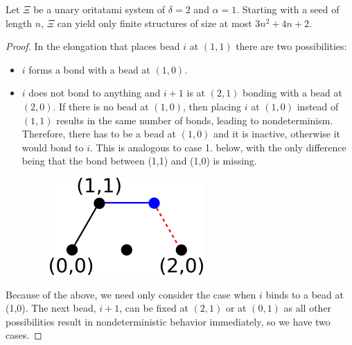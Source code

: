 \begin{lemma}[$\delta=2, \alpha =1$]\label{lem:d2a1}
	Let $\Xi$ be a unary oritatami system of $\delta=2$ and $\alpha = 1$. Starting with a seed of length $n$, $\Xi$ can yield only finite structures of size at most $3n^2+4n+2$.
\end{lemma}
\begin{proof}

In the elongation that places bead $i$ at $(1,1)$ there are two possibilities:
\begin{itemize}
	\item $i$ forms a bond with a bead at $(1,0)$.
	\item  $i$ does not bond to anything and $i+1$ is at $(2,1)$ bonding with a bead at $(2,0)$. If there is no bead at $(1,0)$, then placing $i$ at $(1,0)$ instead of $(1,1)$ results in the same number of bonds, leading to nondeterminism. Therefore, there has to be a bead at $(1,0)$ and it is inactive, otherwise it would bond to $i$. This is analogous to case 1. below, with the only difference being that the bond between (1,1) and (1,0) is missing.%
	\begin{figure}
		\centering
		\includegraphics[width=0.2\linewidth]{./Fig/hexagonOut1}
		\label{fig:hexagonOut1}
	\end{figure}
	
\end{itemize}
 
Because of the above, we need only consider the case when $i$ binds to a bead at (1,0). The next bead, $i+1$, can be fixed at $(2,1)$ or at $(0,1)$ as all other possibilities result in nondeterministic behavior immediately, so we have two cases.


\end{proof}
